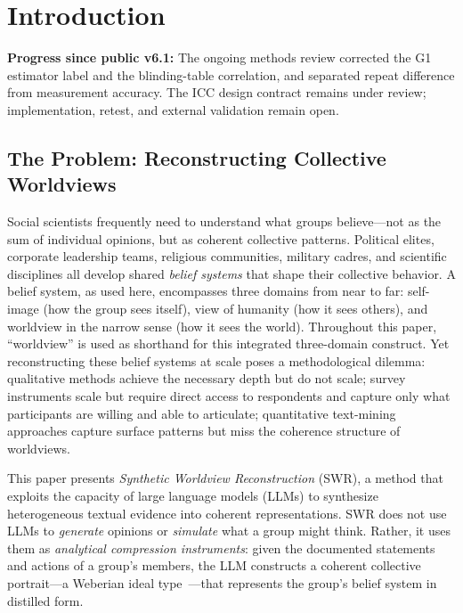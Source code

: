 \documentclass[11pt,a4paper]{article}
\begin{document}
\clearpage
{}
\setcounter{page}{2}
{}
\begingroup
\small
{}
\setlength{\parskip}{0pt}
\setcounter{tocdepth}{2}
\tableofcontents
\endgroup
\clearpage
{}
\setcounter{page}{1}
\hypersetup{pageanchor=true}

\section{Introduction}
\label{sec:introduction}

\noindent\textbf{Progress since public v6.1:} The ongoing methods review corrected the G1 estimator label and the blinding-table correlation, and separated repeat difference from measurement accuracy. The ICC design contract remains under review; implementation, retest, and external validation remain open.

\subsection{The Problem: Reconstructing Collective Worldviews}
\label{sec:intro:problem}

Social scientists frequently need to understand what groups believe---not as the sum of individual opinions, but as coherent collective patterns. Political elites, corporate leadership teams, religious communities, military cadres, and scientific disciplines all develop shared \emph{belief systems} that shape their collective behavior. A belief system, as used here, encompasses three domains from near to far: self-image (how the group sees itself), view of humanity (how it sees others), and worldview in the narrow sense (how it sees the world). Throughout this paper, ``worldview'' is used as shorthand for this integrated three-domain construct. Yet reconstructing these belief systems at scale poses a methodological dilemma: qualitative methods achieve the necessary depth but do not scale; survey instruments scale but require direct access to respondents and capture only what participants are willing and able to articulate; quantitative text-mining approaches capture surface patterns but miss the coherence structure of worldviews.

This paper presents \emph{Synthetic Worldview Reconstruction} (SWR), a method that exploits the capacity of large language models (LLMs) to synthesize heterogeneous textual evidence into coherent representations. SWR does not use LLMs to \emph{generate} opinions or \emph{simulate} what a group might think. Rather, it uses them as \emph{analytical compression instruments}: given the documented statements and actions of a group's members, the LLM constructs a coherent collective portrait---a Weberian ideal type~\citep{Weber1904}---that represents the group's belief system in distilled form.
\end{document}
